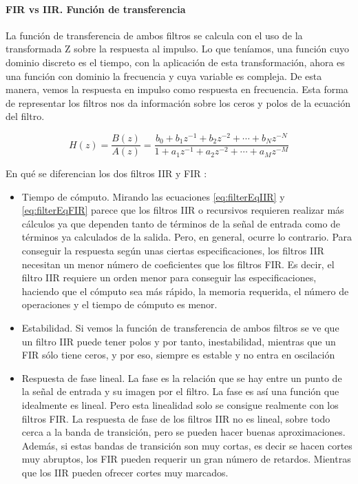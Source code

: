 \paragraph{FIR vs IIR. Función de transferencia}

La función de transferencia de ambos filtros se calcula con el uso de la transformada Z sobre la respuesta al impulso. Lo que teníamos, una función cuyo dominio discreto es el tiempo, con la aplicación de esta transformación, ahora es una función con dominio la frecuencia y cuya variable es compleja. De esta manera, vemos la respuesta en impulso como respuesta en frecuencia. Esta forma de representar los filtros nos da información sobre los ceros y polos de la ecuación del filtro. 

$$ H(z)={\frac {B(z)}{A(z)}}={\frac  {{b_{{0}}+b_{{1}}z^{{-1}}+b_{{2}}z^{{-2}}+\cdots +b_{{N}}z^{{-N}}}}{{1+a_{{1}}z^{{-1}}+a_{{2}}z^{{-2}}+\cdots +a_{{M}}z^{{-M}}}}} $$
\label{eq:filterEqFIR}

En qué se diferencian los dos filtros IIR y FIR :
\begin{itemize}
\item Tiempo de cómputo. Mirando las ecuaciones \ref{eq:filterEqIIR} y \ref{eq:filterEqFIR} %
parece que los filtros IIR o recursivos requieren realizar más cálculos ya que dependen tanto de términos de la señal de entrada como de términos ya calculados de la salida. Pero, en general, ocurre lo contrario. Para conseguir la respuesta según unas ciertas especificaciones, los filtros IIR necesitan un menor número de coeficientes que los filtros FIR. Es decir, el filtro IIR requiere un orden menor para conseguir las especificaciones, haciendo que el cómputo sea más rápido, la memoria requerida, el número de operaciones y el tiempo de cómputo es menor.
\item Estabilidad. Si vemos la función de transferencia de ambos filtros se ve que un filtro IIR puede tener polos y por tanto, inestabilidad, mientras que un FIR sólo tiene ceros, y por eso, siempre es estable y no entra en oscilación
\item Respuesta de fase lineal. La fase es la relación que se hay entre un punto de la señal de entrada y su imagen por el filtro. La fase es así una función que idealmente es lineal. Pero esta linealidad solo se consigue realmente con los filtros FIR. La respuesta de fase de los filtros IIR no es lineal, sobre todo cerca a la banda de transición, pero se pueden hacer buenas aproximaciones. Además, si estas bandas de transición son muy cortas, es decir se hacen cortes muy abruptos, los FIR pueden requerir un gran número de retardos. Mientras que los IIR pueden ofrecer cortes muy marcados. 
\end{itemize}

